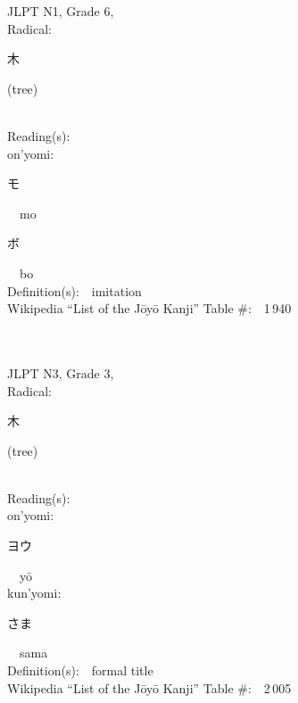 \begin{multicols}{2}
{JLPT N1, Grade 6, \\Radical:\ \ {\begin{CJK}{UTF8}{min} 木 \end{CJK}} (tree) } \\
Reading(s):\ \ \\
{\hspace*{1em}}on'yomi:\ \ \\
{\hspace*{2em}}{\begin{CJK}{UTF8}{min} モ \end{CJK}}\ \ mo\ \ \\
{\hspace*{2em}}{\begin{CJK}{UTF8}{min} ボ \end{CJK}}\ \ bo\ \ \\
Definition(s):\ \ imitation \\
Wikipedia ``List of the J\=oy\=o Kanji'' Table \#:\ \ 1\,940 \\
\ \ \\
{\fontsize{34pt}{40pt}  }\ \ \\  %
{JLPT N3, Grade 3, \\Radical:\ \ {\begin{CJK}{UTF8}{min} 木 \end{CJK}} (tree) } \\
Reading(s):\ \ \\
{\hspace*{1em}}on'yomi:\ \ \\
{\hspace*{2em}}{\begin{CJK}{UTF8}{min} ヨウ \end{CJK}}\ \ y\=o\ \ \\
{\hspace*{1em}}kun'yomi:\ \ \\
{\hspace*{2em}}{\begin{CJK}{UTF8}{min} さま \end{CJK}}\ \ sama\ \ \\
Definition(s):\ \ formal title \\
Wikipedia ``List of the J\=oy\=o Kanji'' Table \#:\ \ 2\,005 \\
\ \ \\
{\fontsize{34pt}{40pt}  }\ \ \\  %

\end{multicols}
